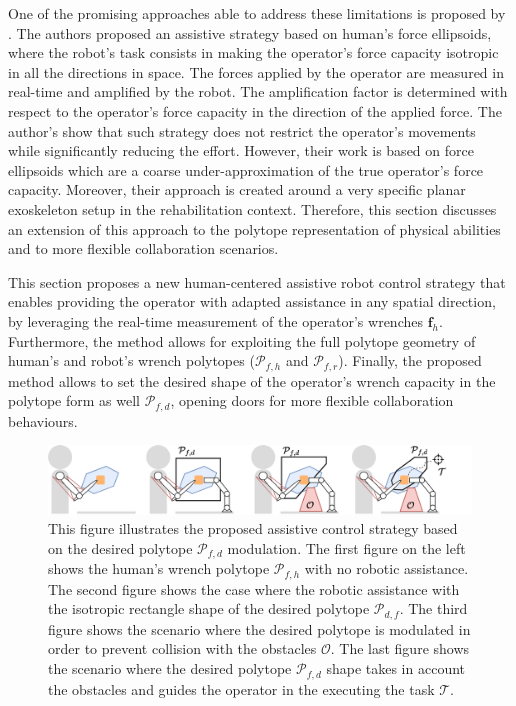 One of the promising approaches able to address these limitations is proposed by \citet{petric2019assistive}.
The authors proposed an assistive strategy based on human's force ellipsoids, where the robot's task consists in making the operator's force capacity isotropic in all the directions in space. The forces applied by the operator are measured in real-time and amplified by the robot. The amplification factor is determined with respect to the operator's force capacity in the direction of the applied force. The author's show that such strategy does not restrict the operator's movements while significantly reducing the effort. However, their work is based on force ellipsoids which are a coarse under-approximation of the true operator's force capacity. Moreover, their approach is created around a very specific planar exoskeleton setup in the rehabilitation context. Therefore, this section discusses an extension of this approach to the polytope representation of physical abilities and to more flexible collaboration scenarios. 

This section proposes a new human-centered assistive robot control strategy that enables providing the operator with adapted assistance in any spatial direction, by leveraging the real-time measurement of the operator's wrenches $\bm{f}_h$. Furthermore, the method allows for exploiting the full polytope geometry of human's and robot's wrench polytopes ($\mathcal{P}_{f,h}$ and $\mathcal{P}_{f,r}$). Finally,  the proposed method allows to set the desired shape of the operator's wrench capacity in the polytope form as well $\mathcal{P}_{f,d}$, opening doors for more flexible collaboration behaviours.

\begin{figure}[!h]
    \centering
    \includegraphics[width=\linewidth]{Papers/lichie/modulatio_all.pdf}
    \caption{This figure illustrates the proposed assistive control strategy based on the desired polytope $\mathcal{P}_{f,d}$ modulation. The first figure on the left shows the human's wrench polytope $\mathcal{P}_{f,h}$ with no robotic assistance. The second figure shows the case where the robotic assistance with the isotropic rectangle shape of the desired polytope $\mathcal{P}_{d,f}$. The third figure shows the scenario where the desired polytope is modulated in order to prevent collision with the obstacles $\mathcal{O}$. The last figure shows the scenario where the desired polytope $\mathcal{P}_{f,d}$ shape takes in account the obstacles and guides the operator in the executing the task $\mathcal{T}$.}
    \label{fig:desired_modulaiton}
\end{figure}

